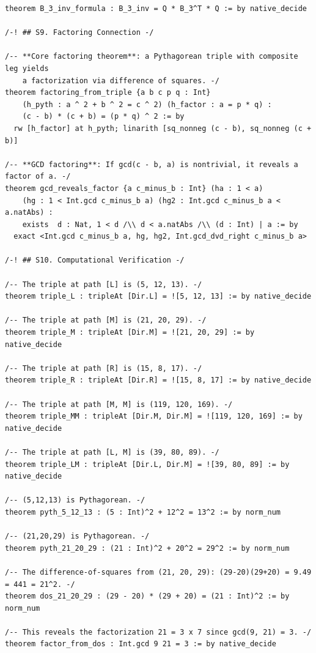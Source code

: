 \documentclass[11pt,openright,twoside]{book}
\theoremstyle{definition}
\begin{document}
\begin{lstlisting}[style=lean]
theorem B_3_inv_formula : B_3_inv = Q * B_3^T * Q := by native_decide

/-! ## S9. Factoring Connection -/

/-- **Core factoring theorem**: a Pythagorean triple with composite leg yields
    a factorization via difference of squares. -/
theorem factoring_from_triple {a b c p q : Int}
    (h_pyth : a ^ 2 + b ^ 2 = c ^ 2) (h_factor : a = p * q) :
    (c - b) * (c + b) = (p * q) ^ 2 := by
  rw [h_factor] at h_pyth; linarith [sq_nonneg (c - b), sq_nonneg (c + b)]

/-- **GCD factoring**: If gcd(c - b, a) is nontrivial, it reveals a factor of a. -/
theorem gcd_reveals_factor {a c_minus_b : Int} (ha : 1 < a)
    (hg : 1 < Int.gcd c_minus_b a) (hg2 : Int.gcd c_minus_b a < a.natAbs) :
    exists  d : Nat, 1 < d /\\ d < a.natAbs /\\ (d : Int) | a := by
  exact <Int.gcd c_minus_b a, hg, hg2, Int.gcd_dvd_right c_minus_b a>

/-! ## S10. Computational Verification -/

/-- The triple at path [L] is (5, 12, 13). -/
theorem triple_L : tripleAt [Dir.L] = ![5, 12, 13] := by native_decide

/-- The triple at path [M] is (21, 20, 29). -/
theorem triple_M : tripleAt [Dir.M] = ![21, 20, 29] := by native_decide

/-- The triple at path [R] is (15, 8, 17). -/
theorem triple_R : tripleAt [Dir.R] = ![15, 8, 17] := by native_decide

/-- The triple at path [M, M] is (119, 120, 169). -/
theorem triple_MM : tripleAt [Dir.M, Dir.M] = ![119, 120, 169] := by native_decide

/-- The triple at path [L, M] is (39, 80, 89). -/
theorem triple_LM : tripleAt [Dir.L, Dir.M] = ![39, 80, 89] := by native_decide

/-- (5,12,13) is Pythagorean. -/
theorem pyth_5_12_13 : (5 : Int)^2 + 12^2 = 13^2 := by norm_num

/-- (21,20,29) is Pythagorean. -/
theorem pyth_21_20_29 : (21 : Int)^2 + 20^2 = 29^2 := by norm_num

/-- The difference-of-squares from (21, 20, 29): (29-20)(29+20) = 9.49 = 441 = 21^2. -/
theorem dos_21_20_29 : (29 - 20) * (29 + 20) = (21 : Int)^2 := by norm_num

/-- This reveals the factorization 21 = 3 x 7 since gcd(9, 21) = 3. -/
theorem factor_from_dos : Int.gcd 9 21 = 3 := by native_decide


\end{lstlisting}
\end{document}

